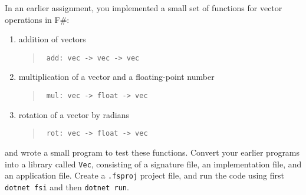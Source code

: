 In an earlier assignment, you implemented a small set of functions for vector operations in F\#:
\begin{enumerate}
\item addition of vectors
  \begin{quote}
    \mbox{\lstinline! add: vec -> vec -> vec!}
  \end{quote}
\item multiplication of a vector and a floating-point number
  \begin{quote}
    \mbox{\lstinline! mul: vec -> float -> vec!}
  \end{quote}
\item rotation of a vector by radians 
  \begin{quote}
    \mbox{\lstinline! rot: vec -> float -> vec!}
  \end{quote}
\end{enumerate}
and wrote a small program to test these functions. Convert your earlier programs into a library called \lstinline{Vec}, consisting of a signature file, an implementation file, and an application file. Create a
\lstinline[language=console]{.fsproj} project file, and run the code using first \lstinline[language=console]{dotnet fsi} and then  \lstinline[language=console]{dotnet run}. 

